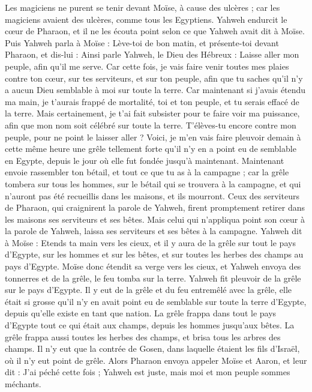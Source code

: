 \begin{multicols}{2}
Les magiciens ne purent se tenir devant Moïse, à cause des ulcères ; car les magiciens avaient des ulcères, comme tous les Egyptiens.
Yahweh endurcit le cœur de Pharaon, et il ne les écouta point selon ce que Yahweh avait dit à Moïse.
Puis Yahweh parla à Moïse : Lève-toi de bon matin, et présente-toi devant Pharaon, et dis-lui : Ainsi parle Yahweh, le Dieu des Hébreux : Laisse aller mon peuple, afin qu'il me serve.
Car cette fois, je vais faire venir toutes mes plaies contre ton cœur, sur tes serviteurs, et sur ton peuple, afin que tu saches qu'il n'y a aucun Dieu semblable à moi sur toute la terre.
Car maintenant si j'avais étendu ma main, je t'aurais frappé de mortalité, toi et ton peuple, et tu serais effacé de la terre.
Mais certainement, je t'ai fait subsister pour te faire voir ma puissance, afin que mon nom soit célébré sur toute la terre\FTNT{}.
T'élèves-tu encore contre mon peuple, pour ne point le laisser aller ?
Voici, je m'en vais faire pleuvoir demain à cette même heure une grêle tellement forte qu’il n'y en a point eu de semblable en Egypte, depuis le jour où elle fut fondée jusqu’à maintenant.
Maintenant envoie rassembler ton bétail, et tout ce que tu as à la campagne ; car la grêle tombera sur tous les hommes, sur le bétail qui se trouvera à la campagne, et qui n’auront pas été recueillis dans les maisons, et ils mourront.
Ceux des serviteurs de Pharaon, qui craignirent la parole de Yahweh, firent promptement retirer dans les maisons ses serviteurs et ses bêtes.
Mais celui qui n'appliqua point son cœur à la parole de Yahweh, laissa ses serviteurs et ses bêtes à la campagne.
Yahweh dit à Moïse : Etends ta main vers les cieux, et il y aura de la grêle sur tout le pays d'Egypte, sur les hommes et sur les bêtes, et sur toutes les herbes des champs au pays d'Egypte.
Moïse donc étendit sa verge vers les cieux, et Yahweh envoya des tonnerres et de la grêle, le feu tomba sur la terre. Yahweh fit pleuvoir de la grêle sur le pays d'Egypte.
Il y eut de la grêle et du feu entremêlé avec la grêle, elle était si grosse qu'il n'y en avait point eu de semblable sur toute la terre d'Egypte, depuis qu'elle existe en tant que nation.
La grêle frappa dans tout le pays d'Egypte tout ce qui était aux champs, depuis les hommes jusqu'aux bêtes. La grêle frappa aussi toutes les herbes des champs, et brisa tous les arbres des champs.
Il n'y eut que la contrée de Gosen, dans laquelle étaient les fils d'Israël, où il n'y eut point de grêle.
Alors Pharaon envoya appeler Moïse et Aaron, et leur dit : J'ai péché cette fois ; Yahweh est juste, mais moi et mon peuple sommes méchants.

\end{multicols}
